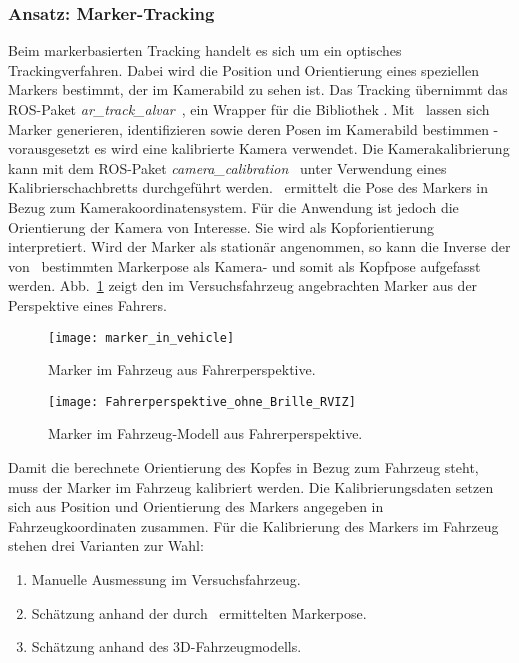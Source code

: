 \subsubsection{Ansatz: Marker-Tracking}
\label{headtracking_markertracking_subsubsec}

Beim markerbasierten Tracking handelt es sich um ein optisches Trackingverfahren.
Dabei wird die Position und Orientierung eines speziellen Markers bestimmt, der im Kamerabild zu sehen ist.
Das Tracking übernimmt das \ac{ROS}-Paket \emph{ar\_track\_alvar}~\cite{ros_ar_track_alvar}, ein Wrapper für die Bibliothek \alvar.
Mit \alvar \ lassen sich Marker generieren, identifizieren sowie deren Posen im Kamerabild bestimmen - vorausgesetzt es wird eine kalibrierte Kamera verwendet.
Die Kamerakalibrierung kann mit dem \ac{ROS}-Paket \emph{camera\_calibration}~\cite{ros_camera_calibration} unter Verwendung eines Kalibrierschachbretts durchgeführt werden.
\alvar \ ermittelt die Pose des Markers in Bezug zum Kamerakoordinatensystem.
Für die Anwendung ist jedoch die Orientierung der Kamera von Interesse.
Sie wird als Kopforientierung interpretiert.
Wird der Marker als stationär angenommen, so kann die Inverse der von \alvar \ bestimmten Markerpose als Kamera- und somit als Kopfpose aufgefasst werden.
Abb.~\ref{fig:marker_in_vehicle_driver_view} zeigt den im Versuchsfahrzeug angebrachten Marker aus der Perspektive eines Fahrers.

\begin{figure}
  \centering
  \texttt{[image: marker\_in\_vehicle]}
  \caption{Marker im Fahrzeug aus Fahrerperspektive.}
  \label{fig:marker_in_vehicle_driver_view}
\end{figure}

\begin{figure}
  \centering
  \texttt{[image: Fahrerperspektive\_ohne\_Brille\_RVIZ]}
  \caption{Marker im Fahrzeug-Modell aus Fahrerperspektive.}
  \label{fig:marker_in_vehicle_model_driver_view}
\end{figure}

Damit die berechnete Orientierung des Kopfes in Bezug zum Fahrzeug steht, muss der Marker im Fahrzeug kalibriert werden.
Die Kalibrierungsdaten setzen sich aus Position und Orientierung des Markers angegeben in Fahrzeugkoordinaten zusammen.
Für die Kalibrierung des Markers im Fahrzeug stehen drei Varianten zur Wahl:
\begin{enumerate}
 \item Manuelle Ausmessung im Versuchsfahrzeug.
 \item Schätzung anhand der durch \alvar \ ermittelten Markerpose.
 \item Schätzung anhand des 3D-Fahrzeugmodells.
\end{enumerate}

